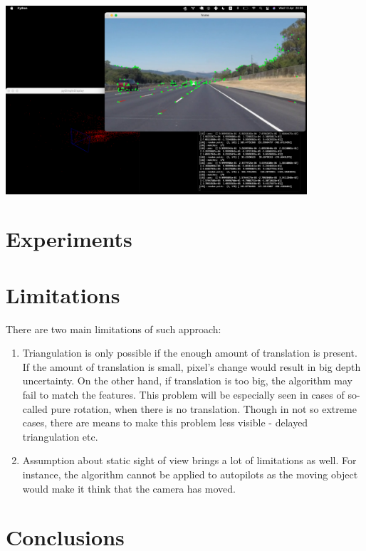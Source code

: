 \begin{center}
    \includegraphics[height=7cm]{res.png}\\[1cm]
\end{center}

\section{Experiments}

\section{Limitations}

There are two main limitations of such approach:
\begin{enumerate}
    \item Triangulation is only possible if the enough amount of translation is present. If the amount of translation is small, pixel's change would result in big depth uncertainty. On the other hand, if translation is too big, the algorithm may fail to match the features. This problem will be especially seen in cases of so-called pure rotation, when there is no translation. Though in not so extreme cases, there are means to make this problem less visible - delayed triangulation etc.
    \item Assumption about static sight of view brings a lot of limitations as well.  For instance, the algorithm cannot be applied to autopilots as the moving object would make it think that the camera has moved. 
\end{enumerate}

\section{Conclusions}

\appendix

